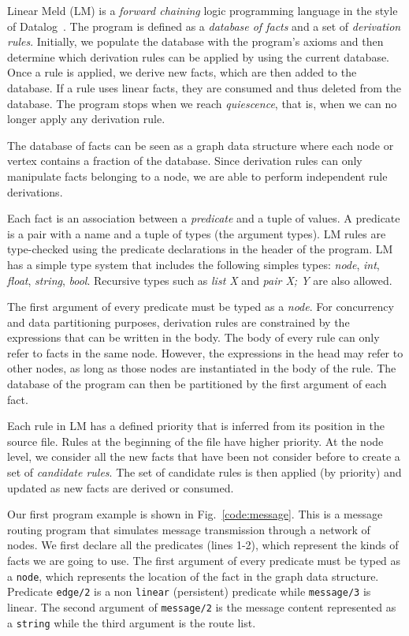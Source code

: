 
Linear Meld (LM) is a \emph{forward chaining} logic programming language in the style of Datalog~\cite{Ullman:1990:PDK:533142}. The program is defined as a \emph{database of facts} and a set of \emph{derivation rules}.
Initially, we populate the database with the program's axioms and then determine which derivation rules can be applied by using the current database. Once a rule is applied, we derive new facts, which are then added to the database.
If a rule uses linear facts, they are consumed and thus deleted from the database.
The program stops when we reach \emph{quiescence}, that is, when we can no longer
apply any derivation rule.

The database of facts can be seen as a graph data structure where each node or vertex contains a
fraction of the database.  Since derivation rules can only manipulate facts belonging to
a node, we are able to perform independent rule derivations.

Each fact is an association between a \emph{predicate} and a tuple of values. A predicate is a pair with a name and a tuple of types (the argument types).
LM rules are type-checked using the predicate declarations in the header of the program. LM has a simple type system that includes the following simples types:
\emph{node}, \emph{int}, \emph{float}, \emph{string}, \emph{bool}. Recursive types such as \emph{list X} and \emph{pair X; Y} are
also allowed.

The first argument of every predicate must be typed as a \emph{node}.
For concurrency and data partitioning purposes, derivation rules are constrained by the expressions that can be written in the body.
The body of every rule can only refer to facts in the same node.
However, the expressions in the head may refer to other nodes, as long as those nodes are instantiated in the body of the rule.
The database of the program can then be partitioned by the first argument of each fact.

Each rule in LM has a defined priority that is inferred from its position in the source file.
Rules at the beginning of the file have higher priority. At the node level, we consider all
the new facts that have been not consider before to create a set of \emph{candidate rules}.
The set of candidate rules is then applied (by priority) and updated as new facts are derived or consumed.

Our first program example is shown in Fig.~\ref{code:message}. This is a message routing program
that simulates message transmission through a network of nodes.
We first declare all the predicates (lines 1-2), which represent the kinds of facts we are going to
use. The first argument of every predicate must be typed as a \texttt{node}, which represents the location of the fact in
the graph data structure. Predicate \texttt{edge/2} is a non \texttt{linear} (persistent) predicate while \texttt{message/3} is linear.
The second argument of \texttt{message/2} is the message content represented as a \texttt{string}
while the third argument is the route list.

